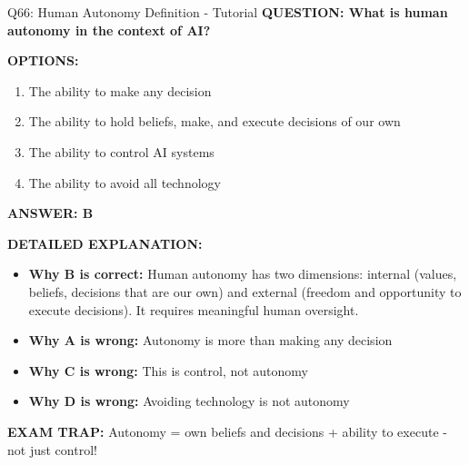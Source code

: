 \documentclass[8pt]{beamer}
\begin{document}
	\begin{frame}{Q66: Human Autonomy Definition - Tutorial}
		\fontsize{6.5}{7.5}\selectfont
		\textbf{QUESTION: What is human autonomy in the context of AI?}
		
		\vspace{0.1cm}
		\textbf{OPTIONS:}
		\begin{enumerate}
			\item The ability to make any decision
			\item The ability to hold beliefs, make, and execute decisions of our own
			\item The ability to control AI systems
			\item The ability to avoid all technology
		\end{enumerate}
		
		\vspace{0.1cm}
		\textcolor{myblue}{\textbf{ANSWER: B}}
		
		\vspace{0.1cm}
		\textbf{DETAILED EXPLANATION:}
		\begin{itemize}
			\item \textbf{Why B is correct:} Human autonomy has two dimensions: internal (values, beliefs, decisions that are our own) and external (freedom and opportunity to execute decisions). It requires meaningful human oversight.
			\item \textbf{Why A is wrong:} Autonomy is more than making any decision
			\item \textbf{Why C is wrong:} This is control, not autonomy
			\item \textbf{Why D is wrong:} Avoiding technology is not autonomy
		\end{itemize}
		
		\textcolor{myred}{\textbf{EXAM TRAP:}} Autonomy = \textcolor{myblue}{own beliefs and decisions + ability to execute} - not just control!
	\end{frame}
	
\end{document}
